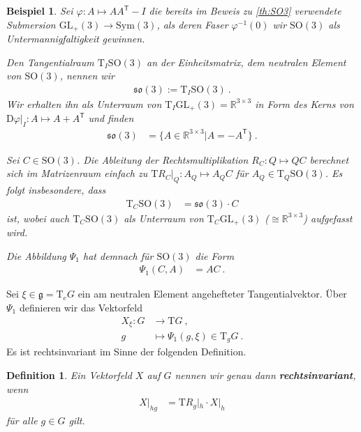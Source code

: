 \documentclass[10pt,a4paper]{article}
\theoremstyle{mytheorem}
\theoremstyle{mydefinition}
\newtheorem{definition}[theorem]{Definition}
\newtheorem{example}[theorem]{Beispiel}
\newcommand{\mydef}[1]{\textbf{\textit{#1}}}
\newcommand{\trans}{^\mathsf{T}}
\newcommand{\Dt}{\mathrm{D}}
\newcommand{\Tt}{\mathrm{T}}
\newcommand{\SO}{\mathrm{SO}}
\newcommand{\fso}{\mathfrak{so}}
\begin{document}
\begin{example}
Sei $\varphi:A\mapsto AA\trans - I$ die bereits im Beweis zu \ref{th:SO3} verwendete Submersion $\mathrm{GL}_+(3)\rightarrow\mathrm{Sym}(3)$, als deren Faser $\varphi^{-1}(0)$ wir $\SO(3)$ als Untermannigfaltigkeit gewinnen.

Den Tangentialraum $\Tt_I\SO(3)$ an der Einheitsmatrix, dem neutralen Element von $\SO(3)$, nennen wir
\begin{align*}
	\fso(3) := \Tt_I\SO(3)
	\ .
\end{align*}
Wir erhalten ihn als Unterraum von $\Tt_I\mathrm{GL}_+(3)=\mathbb{R}^{3\times 3}$ in Form des Kerns von $\Dt\varphi|_I:A\mapsto A+A\trans$ und finden
\begin{align*}
	\fso(3) &= 
	\big\{
		A\in\mathbb{R}^{3\times 3}
		\big| 	
		A = -A\trans
	\big\}
	\ .
\end{align*}

Sei $C\in\SO(3)$.
Die Ableitung der Rechtsmultiplikation $R_C:Q\mapsto QC$ berechnet sich im Matrizenraum einfach zu $\Tt R_C|_Q:A_Q\mapsto A_QC$ für $A_Q\in\Tt_Q\SO(3)$.
Es folgt insbesondere, dass
\begin{align*}
	\Tt_C\SO(3) &= \fso(3)\cdot C
\end{align*}
ist, wobei auch $\Tt_C\SO(3)$ als Unterraum von $\Tt_C\mathrm{GL}_+(3)$ ($\cong\mathbb{R}^{3\times 3}$) aufgefasst wird.

Die Abbildung $\Psi_1$ hat demnach für $\SO(3)$ die Form
\begin{align*}
	\Psi_1(C, A) &= AC
	\ .
\end{align*}
\end{example}

Sei $\xi\in\mathfrak{g}=\Tt_eG$ ein am neutralen Element angehefteter Tangentialvektor.
Über $\Psi_1$ definieren wir das Vektorfeld
\begin{align*}
	X_\xi: G &\rightarrow \Tt G
	\ ,\nonumber\\
	g &\mapsto \Psi_1(g, \xi)\in\Tt_g G
	\ .
\end{align*}
Es ist rechtsinvariant im Sinne der folgenden Definition.

\begin{definition}
Ein Vektorfeld $X$ auf $G$ nennen wir genau dann \mydef{rechtsinvariant}, wenn
\begin{align*}
	X|_{hg} &= \Tt R_g|_h\cdot X|_{h}
\end{align*}
für alle $g\in G$ gilt.
\end{definition}
\end{document}

